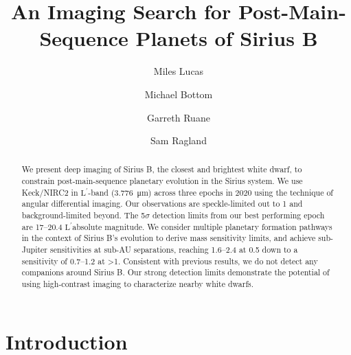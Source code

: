 \documentclass[twocolumn]{aastex631}
\newcommand\Lp{$\mathrm{L}^\prime$}
\begin{document}
\title{An Imaging Search for Post-Main-Sequence Planets of Sirius B}



\author[0000-0001-6341-310X]{Miles Lucas}

\author[0000-0003-1341-5531]{Michael Bottom}

\author[0000-0003-4769-1665]{Garreth Ruane}

\author[0000-0002-0696-1780]{Sam Ragland}


\begin{abstract}
We present deep imaging of Sirius B, the closest and brightest white dwarf, to constrain post-main-sequence planetary evolution in the Sirius system. We use Keck/NIRC2 in \Lp-band (\qty{3.776}{\micro\meter}) across three epochs in 2020 using the technique of angular differential imaging. Our observations are speckle-limited out to \qty{1}{\au} and background-limited beyond. The 5$\sigma$ detection limits from our best performing epoch are \numrange{17}{20.4} \Lp absolute magnitude. We consider multiple planetary formation pathways in the context of Sirius B's evolution to derive mass sensitivity limits, and achieve sub-Jupiter sensitivities at sub-AU separations, reaching \qtyrange{1.6}{2.4}{\jupitermass} at \qty{0.5}{\au} down to a sensitivity of \qtyrange{0.7}{1.2}{\jupitermass} at \textgreater\qty{1}{\au}. Consistent with previous results, we do not detect any companions around Sirius B. Our strong detection limits demonstrate the potential of using high-contrast imaging to characterize nearby white dwarfs.
\end{abstract}

\section{Introduction}\label{sec:intro}
\end{document}
